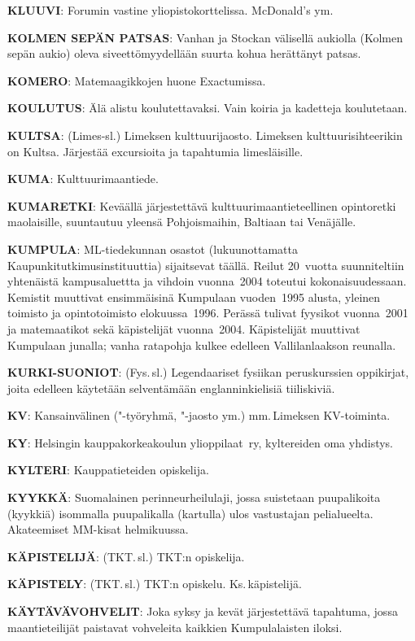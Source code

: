 \documentclass[../ala_hataile.tex]{subfiles}
\begin{document}
\textbf{KLUUVI}: Forumin vastine yliopistokorttelissa.
McDonald's ym.

\textbf{KOLMEN SEPÄN PATSAS}: Vanhan ja
Stockan välisellä aukiolla (Kolmen sepän
aukio) oleva siveettömyydellään suurta kohua
herättänyt patsas.

\textbf{KOMERO}: Matemaagikkojen huone
Exactumissa.

\textbf{KOULUTUS}: Älä alistu koulutettavaksi.
Vain koiria ja kadetteja koulutetaan.

\textbf{KULTSA}: (Limes-sl.) Limeksen kulttuurijaosto.
Limeksen kulttuurisihteerikin on
Kultsa. Järjestää excursioita ja tapahtumia
limesläisille.

\textbf{KUMA}: Kulttuurimaantiede.

\textbf{KUMARETKI}: Keväällä järjestettävä
kulttuurimaantieteellinen opintoretki maolaisille, suuntautuu yleensä Pohjoismaihin,
Baltiaan tai Venäjälle.

\textbf{KUMPULA}: ML-tiedekunnan osastot (lukuun\-ottamatta Kaupunki\-tutkimus\-instituuttia)
sijaitsevat täällä. Reilut 20~vuotta suunniteltiin
yhtenäistä kampusaluettta ja vihdoin
vuonna~2004 toteutui kokonaisuudessaan.
Kemistit muuttivat ensimmäisinä
Kumpulaan vuoden~1995 alusta, yleinen
toimisto ja opintotoimisto elokuussa~1996.
Perässä tulivat fyysikot vuonna~2001 ja matemaatikot
sekä käpistelijät vuonna~2004. Käpistelijät muuttivat Kumpulaan junalla; vanha ratapohja kulkee edelleen Vallilan\-laakson reunalla.

\textbf{KURKI-SUONIOT}: (Fys.\,sl.) Legendaariset
fysiikan peruskurssien oppikirjat, joita
edelleen käytetään selventämään englanninkielisiä
tiiliskiviä.

\textbf{KV}: Kansainvälinen ("-työryhmä, "-jaosto
ym.) mm.\,Limeksen KV-toiminta.

\textbf{KY}: Helsingin kauppa\-korkea\-koulun ylioppilaat~ry, kyltereiden oma yhdistys.

\textbf{KYLTERI}: Kauppatieteiden opiskelija.

\textbf{KYYKKÄ}: Suomalainen perinne\-urheilu\-laji, jossa suistetaan puupalikoita (kyykkiä)
isommalla puupalikalla (kartulla) ulos vastustajan pelialueelta. Akateemiset MM-kisat
helmikuussa.

\textbf{KÄPISTELIJÄ}: (TKT.\,sl.) TKT:n opiskelija.

\textbf{KÄPISTELY}: (TKT.\,sl.) TKT:n opiskelu.
Ks.\,käpistelijä.

\textbf{KÄYTÄVÄVOHVELIT}: Joka syksy ja
kevät järjestettävä tapahtuma, jossa maantieteilijät
paistavat vohveleita kaikkien
Kumpulalaisten iloksi.
\end{document}
